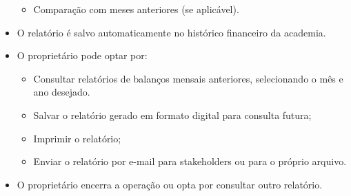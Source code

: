 \begin{itemize}
\begin{itemize}
        \item Comparação com meses anteriores (se aplicável).
    \end{itemize}
    \item O relatório é salvo automaticamente no histórico financeiro da academia.
    \item O proprietário pode optar por:
    \begin{itemize}
        \item Consultar relatórios de balanços mensais anteriores, selecionando o mês e ano desejado.
        \item Salvar o relatório gerado em formato digital para consulta futura;
        \item Imprimir o relatório;
        \item Enviar o relatório por e-mail para stakeholders ou para o próprio arquivo.
    \end{itemize}
    \item O proprietário encerra a operação ou opta por consultar outro relatório.
\end{itemize}


